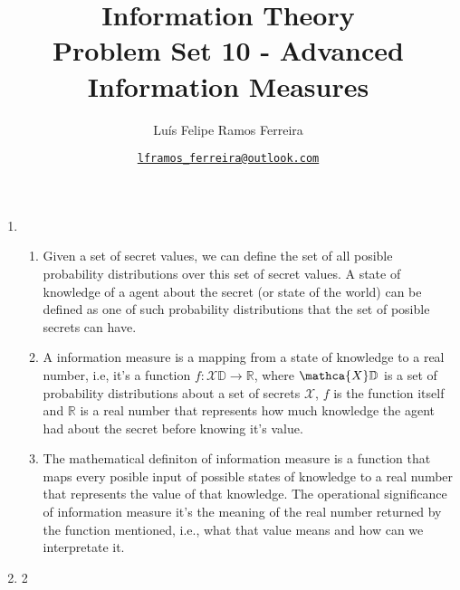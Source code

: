 \documentclass{article}
\title{Information Theory \\ \large Problem Set 10 - Advanced Information Measures}
\author{Luís Felipe Ramos Ferreira}
\date{\href{mailto:lframos\_ferreira@outlook.com}{\texttt{lframos\_ferreira@outlook.com}}
}
\begin{document}
\maketitle

\begin{enumerate}
	\item \begin{enumerate}
		      \item Given a set of secret values, we can define the set of all posible probability distributions over this set of secret values. A state of knowledge of a agent about
		            the secret (or state of the world) can be defined as one of such probability distributions that the set of posible secrets can have.

		      \item A information measure is a mapping from a state of knowledge to a real number, i.e, it's a function \(f: \mathcal{X} \mathbb{D} \rightarrow \mathbb{R}\), where \(\mathca{X} \mathbb{D}\)
		            is a set of probability distributions about a set of secrets \(\mathcal{X}\), \(f\) is the function itself and \(\mathbb{R}\) is a real number that represents how much knowledge the agent had about the secret
		            before knowing it's value.
		      \item The mathematical definiton of information measure is a function that maps every posible input of possible states of knowledge to a real number that represents the value of that knowledge. The operational significance
		            of information measure it's the meaning of the real number returned by the function mentioned, i.e., what that value means and how can we interpretate it.
	      \end{enumerate}
	\item 2
\end{enumerate}


\nocite{*}
\end{document}

